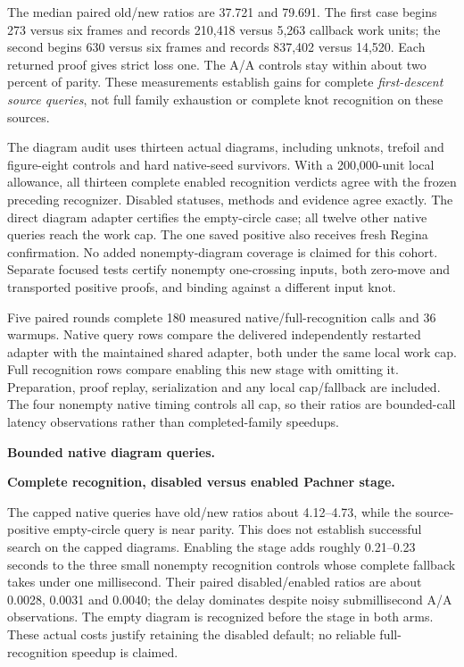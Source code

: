 The median paired old/new ratios are 37.721 and 79.691. The first case
begins 273 versus six frames and records 210,418 versus 5,263 callback work
units; the second begins 630 versus six frames and records 837,402 versus
14,520. Each returned proof gives strict loss one. The A/A controls stay
within about two percent of parity. These measurements establish gains for
complete \emph{first-descent source queries}, not full family exhaustion or
complete knot recognition on these sources.

The diagram audit uses thirteen actual diagrams, including unknots,
trefoil and figure-eight controls and hard native-seed survivors. With a
200,000-unit local allowance, all thirteen complete enabled recognition
verdicts agree with the frozen preceding recognizer. Disabled statuses,
methods and evidence agree exactly. The direct diagram adapter certifies
the empty-circle case; all twelve other native queries reach the work cap.
The one saved positive also receives fresh Regina confirmation. No added
nonempty-diagram coverage is claimed for this cohort. Separate focused tests
certify nonempty one-crossing inputs, both zero-move and transported positive
proofs, and binding against a different input knot.

Five paired rounds complete 180 measured native/full-recognition calls and
36 warmups. Native query rows compare the delivered independently restarted
adapter with the maintained shared adapter, both under the same local work
cap. Full recognition rows compare enabling this new stage with omitting it.
Preparation, proof replay, serialization and any local cap/fallback are
included. The four nonempty native timing controls all cap, so their ratios
are bounded-call latency observations rather than completed-family speedups.

\textbf{Bounded native diagram queries.}

\textbf{Complete recognition, disabled versus enabled Pachner stage.}


The capped native queries have old/new ratios about 4.12--4.73, while the
source-positive empty-circle query is near parity. This does not establish
successful search on the capped diagrams. Enabling the stage adds roughly
0.21--0.23 seconds to the three small nonempty recognition controls whose
complete fallback takes under one millisecond. Their paired disabled/enabled
ratios are about 0.0028, 0.0031 and 0.0040; the delay dominates despite noisy
submillisecond A/A observations. The empty diagram is recognized before the
stage in both arms. These actual costs justify retaining the disabled default;
no reliable full-recognition speedup is claimed.

